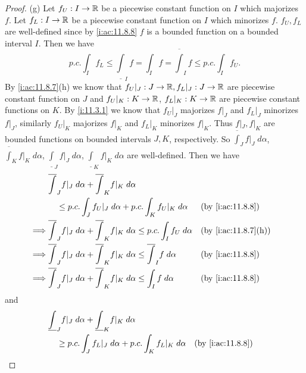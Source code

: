 \begin{proof}{(g)}
  Let \(f_U : I \to \mathbb{R}\) be a piecewise constant function on \(I\) which majorizes \(f\).
  Let \(f_L : I \to \mathbb{R}\) be a piecewise constant function on \(I\) which minorizes \(f\).
  \(f_U, f_L\) are well-defined since by \cref{i:ac:11.8.8} \(f\) is a bounded function on a bounded interval \(I\).
  Then we have
  \[
    p.c. \int_I f_L \leq \underline{\int}_I f = \int_I f = \overline{\int}_I f \leq p.c. \int_I f_U.
  \]
  By \cref{i:ac:11.8.7}(h) we know that \(f_U|_J : J \to \mathbb{R}, f_L|_J : J \to \mathbb{R}\) are piecewise constant function on \(J\) and \(f_U|_K : K \to \mathbb{R}\), \(f_L|_K : K \to \mathbb{R}\) are piecewise constant functions on \(K\).
  By \cref{i:11.3.1} we know that \(f_U|_J\) majorizes \(f|_J\) and \(f_L|_J\) minorizes \(f|_J\), similarly \(f_U|_K\) majorizes \(f|_K\) and \(f_L|_K\) minorizes \(f|_K\).
  Thus \(f|_J, f|_K\) are bounded functions on bounded intervals \(J, K\), respectively.
  So \(\overline{\int}_J f|_J \; d \alpha\), \(\overline{\int}_K f|_K \; d \alpha\), \(\underline{\int}_J f|_J \; d \alpha\), \(\underline{\int}_K f|_K \; d \alpha\) are well-defined.
  Then we have
  \begin{align*}
             & \overline{\int}_J f|_J \; d \alpha + \overline{\int}_K f|_K \; d \alpha                                                               \\
             & \quad \leq p.c. \int_J f_U|_J \; d \alpha + p.c. \int_K f_U|_K \; d \alpha                                   &  & \by{i:ac:11.8.8}    \\
    \implies & \overline{\int}_J f|_J \; d \alpha + \overline{\int}_K f|_K \; d \alpha \leq p.c. \int_I f_U \; d \alpha     &  & \by{i:ac:11.8.7}[h] \\
    \implies & \overline{\int}_J f|_J \; d \alpha + \overline{\int}_K f|_K \; d \alpha \leq \overline{\int}_I f \; d \alpha &  & \by{i:ac:11.8.8}    \\
    \implies & \overline{\int}_J f|_J \; d \alpha + \overline{\int}_K f|_K \; d \alpha \leq \int_I f \; d \alpha            &  & \by{i:ac:11.8.8}
  \end{align*}
  and
  \begin{align*}
             & \underline{\int}_J f|_J \; d \alpha + \underline{\int}_K f|_K \; d \alpha                                                                \\
             & \quad \geq p.c. \int_J f_L|_J \; d \alpha + p.c. \int_K f_L|_K \; d \alpha                                      &  & \by{i:ac:11.8.8}    \\

\end{align*}
\end{proof}
